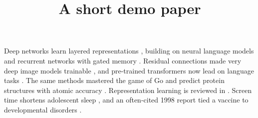 \documentclass{article}
\title{A short demo paper}
\begin{document}
\maketitle
Deep networks learn layered representations \cite{lecun2015}, building on neural language models
\cite{bengio2003} and recurrent networks with gated memory \cite{hochreiter1997}.
Residual connections made very deep image models trainable \cite{he2016}, and pre-trained
transformers now lead on language tasks \cite{devlin2018}.
The same methods mastered the game of Go \cite{silver2016} and predict protein structures with
atomic accuracy \cite{jumper2021}. Representation learning is reviewed in \cite{lecun2015review}.
Screen time shortens adolescent sleep \cite{ramirez2021}, and an often-cited 1998 report tied a
vaccine to developmental disorders \cite{wakefield1998}.


\end{document}
